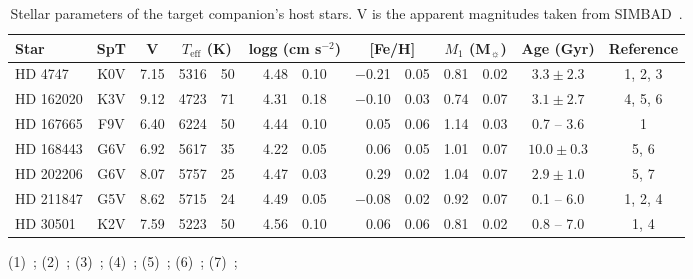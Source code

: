 
\begin{table*}
   \begin{threeparttable}[b]
        \centering{}
        \small{}
        \caption{Stellar parameters of the target companion's host stars. V is the apparent magnitudes taken from {SIMBAD}~\citep{wenger_simbad_2000}.}
        \begin{tabular}{l c c r@{$~\pm~$}l r@{$~\pm~$}l r@{$~\pm~$}l r@{$~\pm~$}l c c}
            \toprule
            Star & SpT & V &  \multicolumn{2}{c}{\(T_{\textrm{eff}}\) (K)} &  \multicolumn{2}{c}{logg (cm s\(^{-2} \))}  & \multicolumn{2}{c}{[Fe/H]} &  \multicolumn{2}{c}{\(M_1\) (M\(_{\sun} \))} & Age (Gyr) & Reference\\
            \midrule
            {HD 4747}     & K0V & 7.15 & 5316 & 50 & 4.48 & 0.10  & $-$0.21 & 0.05 & 0.81 & 0.02  & $3.3 \pm 2.3$  & 1, 2, 3  \\ 
            {HD 162020} & K3V & 9.12 & 4723 & 71 & 4.31 & 0.18  & $-$0.10 & 0.03 & 0.74 & 0.07  & $3.1 \pm 2.7$  & 4, 5, 6  \\  
            {HD 167665} & F9V & 6.40 & 6224 & 50 & 4.44 & 0.10  & 0.05       & 0.06 & 1.14 & 0.03  & 0.7 -- 3.6          & 1         \\
            {HD 168443} & G6V & 6.92 & 5617 & 35 & 4.22 & 0.05 & 0.06       & 0.05 & 1.01 & 0.07  & $10.0 \pm 0.3$ & 5, 6     \\ 
            {HD 202206} & G6V & 8.07 & 5757 & 25 & 4.47 & 0.03 & 0.29       & 0.02 & 1.04 & 0.07  & $2.9 \pm 1.0$   & 5, 7     \\ 
            {HD 211847} & G5V & 8.62 & 5715 & 24 & 4.49 & 0.05 & $-$0.08 & 0.02 & 0.92 & 0.07   & 0.1 -- 6.0           & 1, 2, 4 \\ 
            {HD 30501}   & K2V & 7.59  & 5223 & 50 & 4.56 & 0.10 & 0.06       & 0.06 & 0.81 & 0.02  & 0.8 -- 7.0           & 1, 4     \\
            \bottomrule
        \end{tabular}
        \begin{tablenotes}
           \item[] (1)~\citet{sahlmann_search_2011}; (2)~\citet{santos_spectroscopic_2005}; (3)~\citet{crepp_trends_2016}; (4)~\citet{tsantaki_deriving_2013}; (5)~\cite{bonfanti_age_2016}; (6)~\citet{santos_spectroscopic_2004};
            (7)~\citet{sousa_spectroscopic_2008};
         \end{tablenotes}
         \end{threeparttable}
        \label{tab:starparams}
\end{table*}